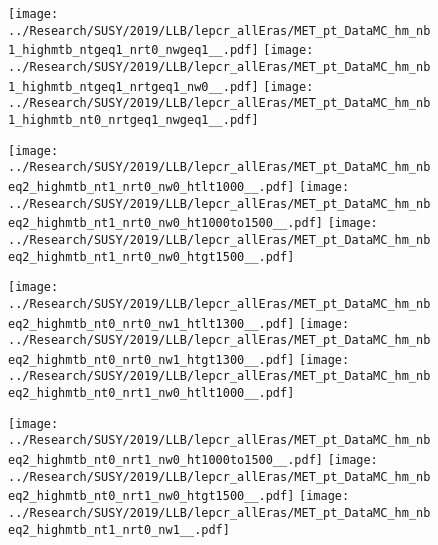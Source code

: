 \begin{figure}[!htb]
  \texttt{[image: ../Research/SUSY/2019/LLB/lepcr\_allEras/MET\_pt\_DataMC\_hm\_nb1\_highmtb\_ntgeq1\_nrt0\_nwgeq1\_\_.pdf]}
\endminipage\hfill
{}
  \texttt{[image: ../Research/SUSY/2019/LLB/lepcr\_allEras/MET\_pt\_DataMC\_hm\_nb1\_highmtb\_ntgeq1\_nrtgeq1\_nw0\_\_.pdf]}
\endminipage\hfill
{}
  \texttt{[image: ../Research/SUSY/2019/LLB/lepcr\_allEras/MET\_pt\_DataMC\_hm\_nb1\_highmtb\_nt0\_nrtgeq1\_nwgeq1\_\_.pdf]}
\endminipage
\end{figure}

\begin{figure}[!htb]
  \texttt{[image: ../Research/SUSY/2019/LLB/lepcr\_allEras/MET\_pt\_DataMC\_hm\_nbeq2\_highmtb\_nt1\_nrt0\_nw0\_htlt1000\_\_.pdf]}
\endminipage\hfill
{}
  \texttt{[image: ../Research/SUSY/2019/LLB/lepcr\_allEras/MET\_pt\_DataMC\_hm\_nbeq2\_highmtb\_nt1\_nrt0\_nw0\_ht1000to1500\_\_.pdf]}
\endminipage\hfill
{}
  \texttt{[image: ../Research/SUSY/2019/LLB/lepcr\_allEras/MET\_pt\_DataMC\_hm\_nbeq2\_highmtb\_nt1\_nrt0\_nw0\_htgt1500\_\_.pdf]}
\endminipage
\end{figure}

\begin{figure}[!htb]
  \texttt{[image: ../Research/SUSY/2019/LLB/lepcr\_allEras/MET\_pt\_DataMC\_hm\_nbeq2\_highmtb\_nt0\_nrt0\_nw1\_htlt1300\_\_.pdf]}
\endminipage\hfill
{}
  \texttt{[image: ../Research/SUSY/2019/LLB/lepcr\_allEras/MET\_pt\_DataMC\_hm\_nbeq2\_highmtb\_nt0\_nrt0\_nw1\_htgt1300\_\_.pdf]}
\endminipage\hfill
{}
  \texttt{[image: ../Research/SUSY/2019/LLB/lepcr\_allEras/MET\_pt\_DataMC\_hm\_nbeq2\_highmtb\_nt0\_nrt1\_nw0\_htlt1000\_\_.pdf]}
\endminipage
\end{figure}

\begin{figure}[!htb]
  \texttt{[image: ../Research/SUSY/2019/LLB/lepcr\_allEras/MET\_pt\_DataMC\_hm\_nbeq2\_highmtb\_nt0\_nrt1\_nw0\_ht1000to1500\_\_.pdf]}
\endminipage\hfill
{}
  \texttt{[image: ../Research/SUSY/2019/LLB/lepcr\_allEras/MET\_pt\_DataMC\_hm\_nbeq2\_highmtb\_nt0\_nrt1\_nw0\_htgt1500\_\_.pdf]}
\endminipage\hfill
{}
  \texttt{[image: ../Research/SUSY/2019/LLB/lepcr\_allEras/MET\_pt\_DataMC\_hm\_nbeq2\_highmtb\_nt1\_nrt0\_nw1\_\_.pdf]}
\endminipage
\end{figure}

